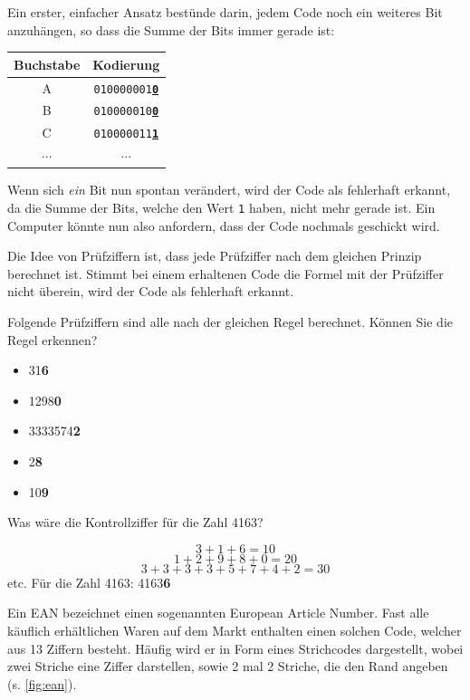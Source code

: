Ein erster, einfacher Ansatz bestünde darin, jedem Code noch ein weiteres Bit anzuhängen, so dass die Summe der Bits immer gerade ist:

\begin{table}[H]
    \centering
    \begin{tabular}{c|c}
        Buchstabe & Kodierung                                \\\midrule\midrule
        A         & \texttt{010000001\underline{\textbf{0}}} \\\midrule
        B         & \texttt{010000010\underline{\textbf{0}}} \\\midrule
        C         & \texttt{010000011\underline{\textbf{1}}} \\\midrule
        $\cdots$  & $\cdots$
    \end{tabular}
\end{table}

Wenn sich \textit{ein} Bit nun spontan verändert, wird der Code als fehlerhaft erkannt, da die Summe der Bits, welche den Wert \texttt{1} haben, nicht mehr gerade ist. Ein Computer könnte nun also anfordern, dass der Code nochmals geschickt wird.

Die Idee von Prüfziffern ist, dass jede Prüfziffer nach dem gleichen Prinzip berechnet ist. Stimmt bei einem erhaltenen Code die Formel mit der Prüfziffer nicht überein, wird der Code als fehlerhaft erkannt.
\begin{myexercise}
    Folgende Prüfziffern sind alle nach der gleichen Regel berechnet. Können Sie die Regel erkennen?
    \begin{itemize}
        \item 31\textbf{6}
        \item 1298\textbf{0}
        \item 3333574\textbf{2}
        \item 2\textbf{8}
        \item 10\textbf{9}
    \end{itemize}
    Was wäre die Kontrollziffer für die Zahl 4163?

    \begin{myanswer}
        \[3 + 1 + 6 = 10\]
        \[1 + 2 + 9 + 8 + 0 = 20\]
        \[3 + 3 + 3 + 3 + 5 + 7 + 4 + 2=30\]
        etc.
        Für die Zahl 4163: 4163\textbf{6}
    \end{myanswer}
\end{myexercise}

Ein EAN bezeichnet einen sogenannten European Article Number. Fast alle käuflich erhältlichen Waren auf dem Markt enthalten einen solchen Code, welcher aus 13 Ziffern besteht. Häufig wird er in Form eines Strichcodes dargestellt, wobei zwei Striche eine Ziffer darstellen, sowie 2 mal 2 Striche, die den Rand angeben (s. \cref{fig:ean}).

